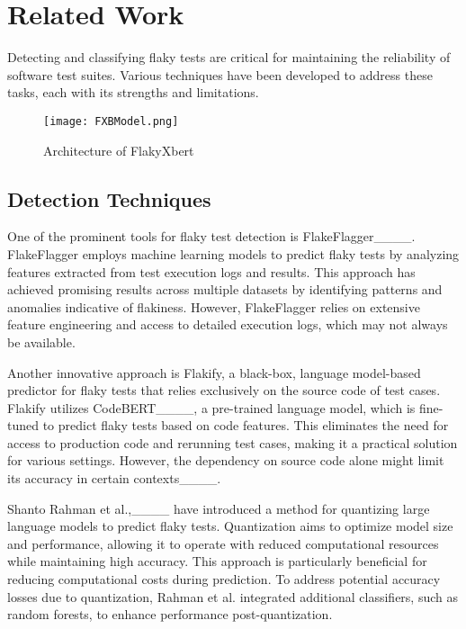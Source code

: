 \section{Related Work}
\label{sec:Related Work}

Detecting and classifying flaky tests are critical for maintaining the reliability of software test suites. Various techniques have been developed to address these tasks, each with its strengths and limitations.
\vspace{2mm}
\begin{figure*}[t!]
    \centering
    \texttt{[image: FXBModel.png]} %
    \caption{Architecture of FlakyXbert}
    \label{fig:flakyxbert}
\end{figure*}

\subsection{Detection Techniques}

One of the prominent tools for flaky test detection is FlakeFlagger____. FlakeFlagger employs machine learning models to predict flaky tests by analyzing features extracted from test execution logs and results. This approach has achieved promising results across multiple datasets by identifying patterns and anomalies indicative of flakiness. However, FlakeFlagger relies on extensive feature engineering and access to detailed execution logs, which may not always be available.

Another innovative approach is Flakify, a black-box, language model-based predictor for flaky tests that relies exclusively on the source code of test cases. Flakify utilizes CodeBERT____, a pre-trained language model, which is fine-tuned to predict flaky tests based on code features. This eliminates the need for access to production code and rerunning test cases, making it a practical solution for various settings. However, the dependency on source code alone might limit its accuracy in certain contexts____.

Shanto Rahman et al.,____ have introduced a method for quantizing large language models to predict flaky tests. Quantization aims to optimize model size and performance, allowing it to operate with reduced computational resources while maintaining high accuracy. This approach is particularly beneficial for reducing computational costs during prediction. To address potential accuracy losses due to quantization, Rahman et al. integrated additional classifiers, such as random forests, to enhance performance post-quantization.



